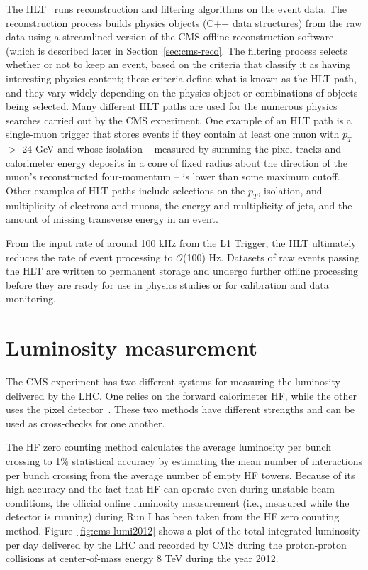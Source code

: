 The HLT~\cite{Cittolin:578006} runs reconstruction and filtering algorithms on the event data. The reconstruction process builds physics objects (C++ data structures) from the raw data using a streamlined version of the CMS offline reconstruction software (which is described later in Section~\ref{sec:cms-reco}. The filtering process selects whether or not to keep an event, based on the criteria that classify it as having interesting physics content; these criteria define what is known as the HLT path, and they vary widely depending on the physics object or combinations of objects being selected. Many different HLT paths are used for the numerous physics searches carried out by the CMS experiment. One example of an HLT path is a single-muon trigger that stores events if they contain at least one muon with $p_T$ $>$ 24 GeV and whose isolation -- measured by summing the pixel tracks and calorimeter energy deposits in a cone of fixed radius about the direction of the muon's reconstructed four-momentum -- is lower than some maximum cutoff. Other examples of HLT paths include selections on the $p_T$, isolation, and multiplicity of electrons and muons, the energy and multiplicity of jets, and the amount of missing transverse energy in an event.

From the input rate of around 100 kHz from the L1 Trigger, the HLT ultimately reduces the rate of event processing to $\mathcal{O}$(100) Hz. Datasets of raw events passing the HLT are written to permanent storage and undergo further offline processing before they are ready for use in physics studies or for calibration and data monitoring.

\section{Luminosity measurement\label{sec:cms-lumi}}

The CMS experiment has two different systems for measuring the luminosity delivered by the LHC. One relies on the forward calorimeter HF, while the other uses the pixel detector~\cite{CMS-PAS-LUM-13-001}. These two methods have different strengths and can be used as cross-checks for one another.

The HF zero counting method calculates the average luminosity per bunch crossing to 1\% statistical accuracy by estimating the mean number of interactions per bunch crossing from the average number of empty HF towers. Because of its high accuracy and the fact that HF can operate even during unstable beam conditions, the official online luminosity measurement (i.e., measured while the detector is running) during Run I has been taken from the HF zero counting method. Figure~\ref{fig:cms-lumi2012} shows a plot of the total integrated luminosity per day delivered by the LHC and recorded by CMS during the proton-proton collisions at center-of-mass energy 8 TeV during the year 2012.

